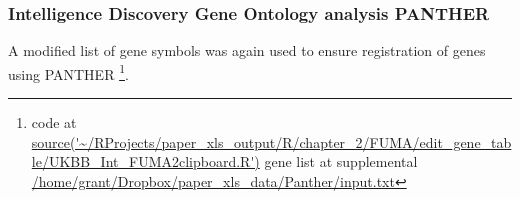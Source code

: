 








\subsubsection{Intelligence Discovery Gene Ontology analysis PANTHER}
A modified list of gene symbols was again used  to ensure registration of genes using PANTHER \footnote{code at \url{source('~/RProjects/paper_xls_output/R/chapter_2/FUMA/edit_gene_table/UKBB_Int_FUMA2clipboard.R')} gene list at supplemental \url{/home/grant/Dropbox/paper_xls_data/Panther/input.txt}}.






